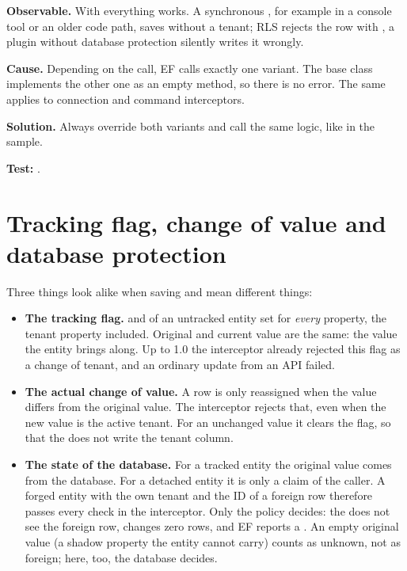 \begin{failure}
  \textbf{Observable.} With  everything
  works. A synchronous , for example in a console tool or an
  older code path, saves without a tenant; RLS rejects the row with , a
  plugin without database protection silently writes it wrongly.

  \textbf{Cause.} Depending on the call, EF calls exactly one variant. The base class
   implements the other one as an
  empty method, so there is no error. The same applies to connection and command
  interceptors.

  \textbf{Solution.} Always override both variants and call the same logic, like
   in the sample.

  \textbf{Test:}
  .
\end{failure}

\section{Tracking flag, change of value and database protection}\label{sec:tracking-flag-versus-value}

Three things look alike when saving and mean different things:

\begin{itemize}
  \item \textbf{The tracking flag.}  and
     of an untracked entity set  for \emph{every}
    property, the tenant property included. Original and current value are the same: the value
    the entity brings along. Up to 1.0 the interceptor already rejected this flag as a change of
    tenant, and an ordinary update from an API failed.
  \item \textbf{The actual change of value.} A row is only reassigned when the value differs from
    the original value. The interceptor rejects that, even when the new value is the active
    tenant. For an unchanged value it clears the flag, so that the  does not write
    the tenant column.
  \item \textbf{The state of the database.} For a tracked entity the original value comes from
    the database. For a detached entity it is only a claim of the caller. A forged entity with
    the own tenant and the ID of a foreign row therefore passes every check in the interceptor.
    Only the policy decides: the  does not see the foreign row, changes zero rows,
    and EF reports a .
    An empty original value (a shadow property the entity cannot carry) counts as unknown, not
    as foreign; here, too, the database decides.
\end{itemize}

